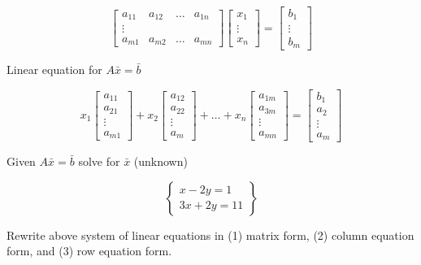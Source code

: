 \documentclass[main.tex]{subfiles}
\begin{document}
    $$
    \left[\begin{array}{cccc}
    a_{11} & a_{12} & \ldots & a_{1 n} \\
    \vdots & & & \\
    a_{m 1} & a_{m 2} & \ldots & a_{m n}
    \end{array}\right]\left[\begin{array}{c}
    x_{1} \\
    \vdots \\
    x_{n}
    \end{array}\right]=\left[\begin{array}{c}
    b_{1} \\
    \vdots \\
    b_{m}
    \end{array}\right]
    $$
    
    Linear equation for $A \bar{x} = \bar{b}$
    
    $$
    x_{1}\left[\begin{array}{c}
    a_{11} \\
    a_{21} \\
    \vdots \\
    a_{m 1}
    \end{array}\right]+x_{2}\left[\begin{array}{c}
    a_{12} \\
    a_{22} \\
    \vdots \\
    a_{m}
    \end{array}\right]+\ldots+x_{n}\left[\begin{array}{c}
    a_{1 m} \\
    a_{3 m} \\
    \vdots \\
    a_{m n}
    \end{array}\right]=\left[\begin{array}{c}
    b_{1} \\
    a_{2} \\
    \vdots \\
    a_{m}
    \end{array}\right]
    $$

    Given $A \bar{x} = \bar{b}$ solve for $\bar{x}$ (unknown)
    
    $$
    \left\{\begin{array}{l}
    x-2 y=1 \\
    3 x+2 y=11
    \end{array}\right\}
    $$
    
    Rewrite above system of linear equations in (1) matrix form, (2) column equation form, and (3) row equation form.
    
\end{document}
